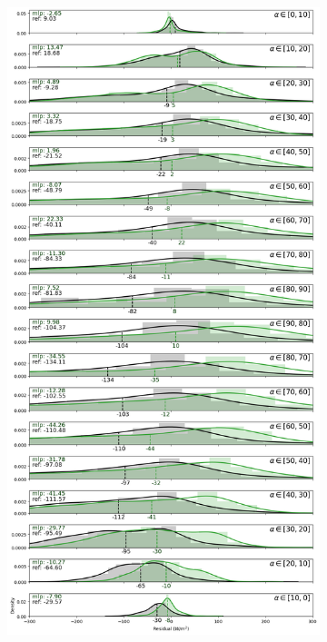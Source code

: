 \begin{figure}[htb!]
    \begin{subfigure}{0.49\columnwidth}
        \includegraphics[width=\columnwidth, height=0.9\textheight]{figures/first_study/residual_errors_mlp_site1_rmse.png}

\end{subfigure}
\end{figure}
